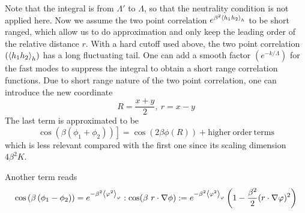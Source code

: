 \documentclass[submission, PhysLectNotes]{SciPost}
\begin{document}
Note that the integral is from \(\Lambda '\) to $\Lambda $, so that the neutrality condition is not applied here. Now we assume the two point correlation $e^{\beta ^2 \expval{h_1h_2}_h}$ to be short ranged, which allow us to do approximation and only keep the leading order of the relative distance $r$. With a hard cutoff used above, the two point correlation $(\expval{h_1h_2}_h)$ has a long fluctuating tail. One can add a smooth factor $(e^{-k/\Lambda })$ for the fast modes to suppress the integral to obtain a short range correlation functions. Due to short range nature of the two point correlation, one can introduce the new coordinate 
\begin{equation}
R = \frac{x+y}{2}, \ r = x-y
\end{equation}
The last term is approximated to be
\begin{equation}
\left.\cos \left( \beta  \left(\phi _1 + \phi _2\right) \right) \right] = \cos  (2 \beta  \phi  (R)) + \mathrm{higher \ order \ terms} 
\end{equation}
which is less relevant compared with the first one since its scaling dimension $4\beta^2 K$.

Another term reads
\begin{equation}
	\begin{aligned}
		\cos \left( \beta  \left(\phi _1 - \phi _2\right) \right) = e^{-\beta^2\expval{\varphi^2}_{\varphi}}:\cos ( \beta \text{  }r\cdot \nabla \phi  ): = e^{-\beta^2\expval{\varphi^2}_{\varphi}}\left(1 - \frac{\beta ^2}{2} ( r\cdot \nabla \varphi)^2 \right)		
	\end{aligned}
\end{equation}
\end{document}

